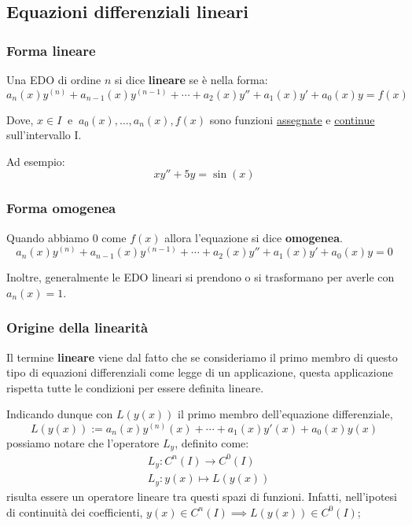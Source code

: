 \subsection{Equazioni differenziali lineari}

\subsubsection{Forma lineare}

Una EDO di ordine \(n\) si dice \textbf{lineare} se è nella forma:
\[
    a_n(x)y^{(n)}+a_{n-1}(x)y^{(n-1)}+ \cdots + a_2(x)y''+a_1(x)y'+a_0(x)y=f(x)
\]

Dove, \(x \in I\ \text{ e }\ a_0(x),\ldots,a_n(x),f(x)\) sono funzioni \underline{assegnate} e \underline{continue} sull'intervallo I.

Ad esempio:
\[
    xy''+5y = \sin(x)
\]

\subsubsection{Forma omogenea}

Quando abbiamo \(0\) come \(f(x)\) allora l'equazione si dice \textbf{omogenea}.
\[
    a_n(x)y^{(n)}+a_{n-1}(x)y^{(n-1)}+ \cdots + a_2(x)y''+a_1(x)y'+a_0(x)y=0
\]

Inoltre, generalmente le EDO lineari si prendono o si trasformano per averle con \(a_{n}(x) = 1\).

\subsubsection{Origine della linearità}

Il termine \textbf{lineare} viene dal fatto che se consideriamo il primo membro di questo tipo di equazioni differenziali come legge di un applicazione, questa applicazione rispetta tutte le condizioni per essere definita lineare.

Indicando dunque con \(L(y(x))\) il primo membro dell'equazione differenziale,
\[
    L(y(x)) := a_n (x) y^{(n)} (x) + \cdots + a_1(x)y'(x) + a_0(x)y(x)
\]
possiamo notare che l'operatore \(L_y\), definito come:
\begin{align*}
     & L_y: C^{n}(I) \rightarrow C^0(I) \\
     & L_y: y(x) \mapsto L(y(x))
\end{align*}
risulta essere un operatore lineare tra questi spazi di funzioni. Infatti, nell'ipotesi di continuità dei coefficienti, \(y(x) \in C^n(I) \implies L(y(x)) \in C^0(I)\);

